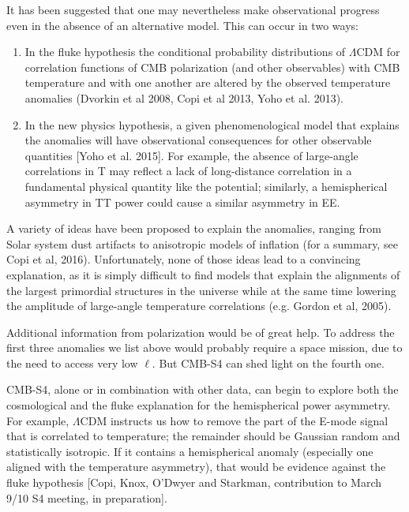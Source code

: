 It has been suggested that one may nevertheless make observational progress even in the absence of an alternative model.  This can occur in two ways:
\begin{enumerate}
  \item In the fluke hypothesis the conditional probability distributions of $\Lambda$CDM for correlation functions of CMB polarization
  (and other observables) with CMB temperature and with one another are altered by the observed temperature anomalies  
  (Dvorkin et al 2008, Copi et al 2013, Yoho et al. 2013). 
  \item In the new physics hypothesis, a given phenomenological model that explains the anomalies will have observational consequences
  for other observable quantities [Yoho et al. 2015]. For example, the absence of large-angle correlations in T may reflect a lack of
  long-distance correlation in a fundamental physical quantity like the potential; similarly, 
  a hemispherical asymmetry in TT power could cause a similar asymmetry in EE.
\end{enumerate}

A variety of ideas have been proposed to explain the anomalies, ranging from Solar system dust artifacts to anisotropic models of inflation (for a summary, see Copi et al, 2016). Unfortunately, none of those ideas lead to a convincing explanation, as it is simply difficult to find models that explain the alignments of the largest primordial structures in the universe while at the same time lowering the amplitude of large-angle temperature correlations (e.g. Gordon et al, 2005). 

Additional information from polarization would be of great help. To address the first three anomalies we list above would probably require a space mission, due to the need to access very low $\ell$. But CMB-S4 can shed light on the fourth one. 

CMB-S4, alone or in combination with other data, can begin to explore both the cosmological and the fluke explanation for the hemispherical power asymmetry.  For example, $\Lambda$CDM instructs us how to remove the part of the E-mode signal that is correlated to temperature; the remainder should be Gaussian random and statistically isotropic.  If it contains a hemispherical anomaly (especially one aligned with the temperature asymmetry), that would be evidence against the fluke hypothesis [Copi, Knox, O’Dwyer and Starkman, contribution to March 9/10 S4 meeting, in preparation]. 

